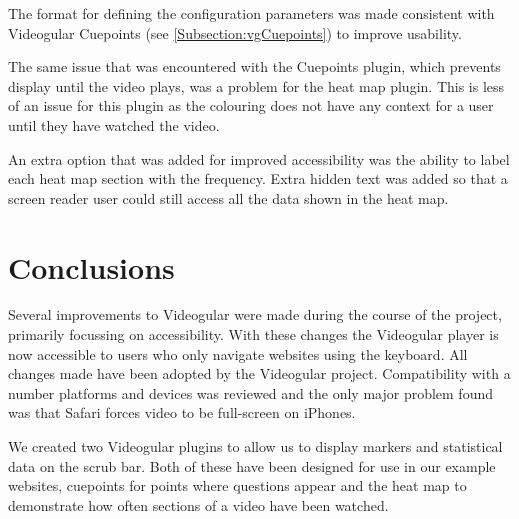 The format for defining the configuration parameters was made consistent with Videogular Cuepoints (see \autoref{Subsection:vgCuepoints}) to improve usability.

The same issue that was encountered with the Cuepoints plugin, which prevents display until the video plays, was a problem for the heat map plugin. This is less of an issue for this plugin as the colouring does not have any context for a user until they have watched the video.

An extra option that was added for improved accessibility was the ability to label each heat map section with the frequency. Extra hidden text was added so that a screen reader user could still access all the data shown in the heat map.

\section{Conclusions}

Several improvements to \gls{Videogular} were made during the course of the project, primarily focussing on accessibility. With these changes the \gls{Videogular} player is now accessible to users who only navigate websites using the keyboard. All changes made have been adopted by the \gls{Videogular} project. Compatibility with a number platforms and devices was reviewed and the only major problem found was that Safari forces video to be full-screen on iPhones.

We created two \gls{Videogular} plugins to allow us to display markers and statistical data on the \gls{scrub bar}. Both of these have been designed for use in our example websites, cuepoints for points where questions appear and the heat map to demonstrate how often sections of a video have been watched.


